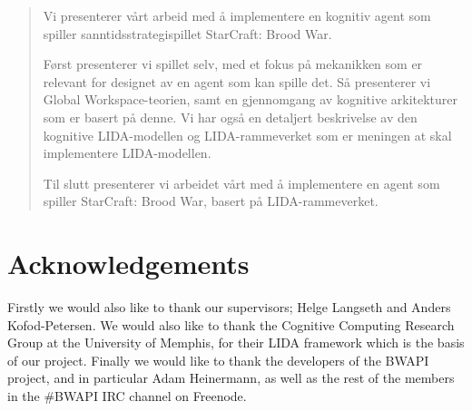\documentclass[a4paper, twoside, openright, 12pt]{report}
\begin{document}
\begin{abstract}
Vi presenterer vårt arbeid med å implementere en kognitiv agent som spiller sanntidsstrategispillet StarCraft: Brood War.

Først presenterer vi spillet selv, med et fokus på mekanikken som er relevant for designet av en agent som kan spille det. Så presenterer vi Global Workspace-teorien, samt en gjennomgang av kognitive arkitekturer som er basert på denne. Vi har også en detaljert beskrivelse av den kognitive LIDA-modellen og LIDA-rammeverket som er meningen at skal implementere LIDA-modellen.

Til slutt presenterer vi arbeidet vårt med å implementere en agent som spiller StarCraft: Brood War, basert på LIDA-rammeverket.
\end{abstract}
\thispagestyle{empty}
\cleardoublepage

\chapter*{Acknowledgements}
\thispagestyle{empty}

Firstly we would also like to thank our supervisors; Helge Langseth and Anders Kofod-Petersen. We would also like to thank the Cognitive Computing Research Group at the University of Memphis, for their LIDA framework which is the basis of our project. Finally we would like to thank the developers of the BWAPI project, and in particular Adam Heinermann, as well as the rest of the members in the \#BWAPI IRC channel on Freenode.

\clearpage

\cleardoublepage


\tableofcontents
\cleardoublepage
\listoffigures
\cleardoublepage
\thispagestyle{empty}
\cleardoublepage

\pagestyle{fancy}






\endrefsection

\cleardoublepage
{}
{}
\printbibliography[segment=0]
\end{document}
